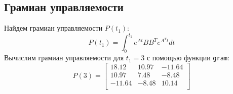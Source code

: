 \subsection{Грамиан управляемости}
Найдем грамиан управляемости $P(t_1)$:
\begin{equation}
    P(t_1) = \int_{0}^{t_1} e^{At}BB^Te^{A^Tt}dt
\end{equation}
Вычислим грамиан управляемости для $t_1 = 3$ с помощью функции \texttt{gram}: 
\begin{equation}
    P(3) = \begin{bmatrix}
        18.12 & 10.97 & -11.64 \\ 
        10.97 & 7.48 & -8.48 \\ 
        -11.64 & -8.48 & 10.14 \\ 
    \end{bmatrix}
\end{equation}


